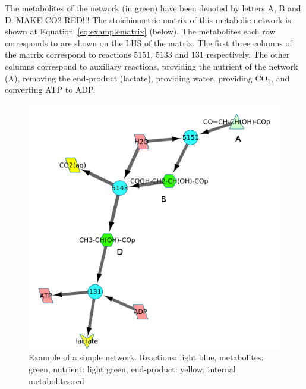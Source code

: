 \documentclass[10pt,a4paper]{article}
\begin{document}
	The metabolites of the network (in green) have been denoted by letters A, B and D. MAKE CO2 RED!!! The stoichiometric matrix of this metabolic network is shown at Equation~\ref{eq:examplematrix} (below). The metabolites each row corresponds to are shown on the LHS of the matrix. The first three columns of the matrix correspond to reactions $5151$, $5133$ and $131$ respectively. The other columns correspond to auxiliary reactions, providing the nutrient of the network (A), removing the end-product (lactate), providing water, providing CO$_2$, and converting ATP to ADP. 

\begin{figure}[t]
	\centering
	\includegraphics[width=0.5\linewidth]{initial_network_ABC.png}
	\caption{Example of a simple network. Reactions: light blue, metabolites: green, nutrient: light green, end-product: yellow, internal metabolites:red}
	\label{fig:examplenetwork}
\end{figure}
\end{document}
